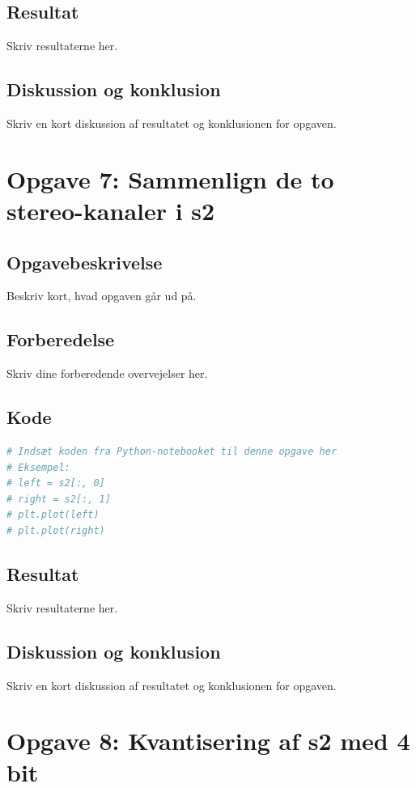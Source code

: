 ﻿\documentclass[11pt,a4paper]{report}
\begin{document}
\subsection{Resultat}
Skriv resultaterne her.

\subsection{Diskussion og konklusion}
Skriv en kort diskussion af resultatet og konklusionen for opgaven.

\newpage

\section{Opgave 7: Sammenlign de to stereo-kanaler i s2}
\subsection{Opgavebeskrivelse}
Beskriv kort, hvad opgaven går ud på.

\subsection{Forberedelse}
Skriv dine forberedende overvejelser her.

\subsection{Kode}
\begin{lstlisting}[language=Python]
# Indsæt koden fra Python-notebooket til denne opgave her
# Eksempel:
# left = s2[:, 0]
# right = s2[:, 1]
# plt.plot(left)
# plt.plot(right)
\end{lstlisting}

\subsection{Resultat}
Skriv resultaterne her.

\subsection{Diskussion og konklusion}
Skriv en kort diskussion af resultatet og konklusionen for opgaven.

\newpage

\section{Opgave 8: Kvantisering af s2 med 4 bit}
\end{document}
